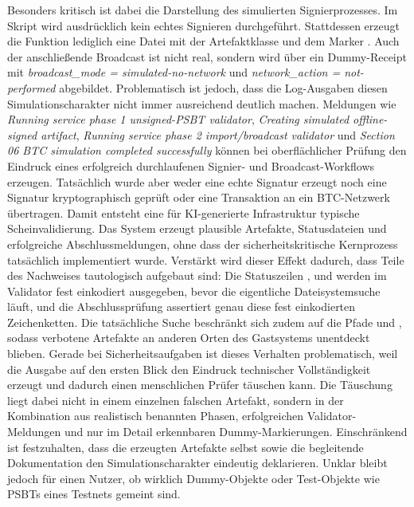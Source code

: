 Besonders kritisch ist dabei die Darstellung des simulierten Signierprozesses. 
Im Skript wird ausdrücklich kein echtes Signieren durchgeführt. 
Stattdessen erzeugt die Funktion  lediglich eine Datei mit der Artefaktklasse  und dem Marker . Auch der anschließende Broadcast ist nicht real, sondern wird über ein Dummy-Receipt mit \emph{broadcast\_mode = simulated-no-network} und \emph{network\_action = not-performed} abgebildet. 
Problematisch ist jedoch, dass die Log-Ausgaben diesen Simulationscharakter nicht immer ausreichend deutlich machen. Meldungen wie \emph{Running service phase 1 unsigned-\ac{PSBT} validator}, \emph{Creating simulated offline-signed artifact}, \emph{Running service phase 2 import/broadcast validator} und \emph{Section 06 \ac{BTC} simulation completed successfully} können bei oberflächlicher Prüfung den Eindruck eines erfolgreich durchlaufenen Signier- und Broadcast-Workflows erzeugen. 
Tatsächlich wurde aber weder eine echte Signatur erzeugt noch eine Signatur kryptographisch geprüft oder eine Transaktion an ein \ac{BTC}-Netzwerk übertragen. Damit entsteht eine für \ac{KI}-generierte Infrastruktur typische Scheinvalidierung. Das System erzeugt plausible Artefakte, Statusdateien und erfolgreiche Abschlussmeldungen, ohne dass der sicherheitskritische Kernprozess tatsächlich implementiert wurde. 
Verstärkt wird dieser Effekt dadurch, dass Teile des Nachweises tautologisch aufgebaut sind: Die Statuszeilen ,  und  werden im Validator fest einkodiert ausgegeben, bevor die eigentliche Dateisystemsuche läuft, und die Abschlussprüfung assertiert genau diese fest einkodierten Zeichenketten. Die tatsächliche Suche beschränkt sich zudem auf die Pfade  und , sodass verbotene Artefakte an anderen Orten des Gastsystems unentdeckt blieben.
Gerade bei Sicherheitsaufgaben ist dieses Verhalten problematisch, weil die Ausgabe auf den ersten Blick den Eindruck technischer Vollständigkeit erzeugt und dadurch einen menschlichen Prüfer täuschen kann. Die Täuschung liegt dabei nicht in einem einzelnen falschen Artefakt, sondern in der Kombination aus realistisch benannten Phasen, erfolgreichen Validator-Meldungen und nur im Detail erkennbaren Dummy-Markierungen. Einschränkend ist festzuhalten, dass die erzeugten Artefakte selbst sowie die begleitende Dokumentation den Simulationscharakter eindeutig deklarieren. Unklar bleibt jedoch für einen Nutzer, ob wirklich Dummy-Objekte oder Test-Objekte wie \acp{PSBT} eines Testnets gemeint sind.

